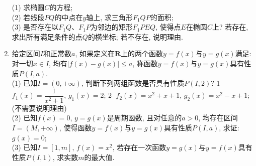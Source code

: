 \documentclass[10pt,a4paper]{article}
\begin{document}
\begin{enumerate}[1.]
\begin{center}
\begin{tikzpicture}[>=latex,scale = 1.5]
    \end{tikzpicture}
\end{center}
(1)	求椭圆$C$的方程;\\
(2)	若线段$PQ$的中点在$y$轴上, 求三角形$F_1QP$的面积;\\
(3)	是否存在以$F_1Q$、$F_1P$为邻边的矩形$F_1PEQ$, 使得点$E$在椭圆$C$上? 若存在, 求出所有满足条件的点$Q$的横坐标; 若不存在, 说明理由.
\item 给定区间$I$和正常数$a$, 如果定义在$\mathbf{R}$上的两个函数$y=f(x)$与$y=g(x)$满足: 对一切$x\in I$, 均有$|f(x)-g(x)|\le a$, 称函数$y=f(x)$与$y=g(x)$具有性质$P(I,a)$.\\
(1)	已知$I=(0,+\infty)$, 判断下列两组函数是否具有性质$P(I,2)$? \textcircled{1} $f_1(x)=\dfrac 1{{x^2}+1}$, $g_1(x)=2$; \textcircled{2} $f_2(x)=x^2+x+1$, $g_2(x)=x^2-x+1$;(不需要说明理由)\\
(2)	已知$f(x)=0$, $y=g(x)$是周期函数, 且对任意的$a>0$, 均存在区间$I=(M,+\infty)$, 使得函数$y=f(x)$与$y=g(x)$具有性质$P(I,a)$, 求证: $g(x)=0$;\\
(3)	已知$I=[1,m]$, $f(x)=x^2$, 若存在一次函数$y=g(x)$与$y=f(x)$具有性质$P(I,1)$, 求实数$m$的最大值.


\end{enumerate}
\end{document}
